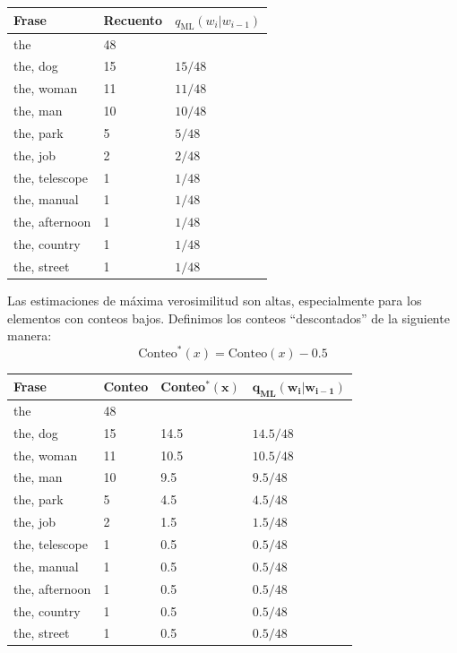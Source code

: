 \begin{table}[h]
    \centering
    \begin{tabular}{lll}
        \textbf{Frase} & \textbf{Recuento} & \textbf{$q_{\text{ML}}(w_i | w_{i-1})$} \\
        \hline
        the & 48 & \\
        the, dog & 15 & $15/48$ \\
        the, woman & 11 & $11/48$ \\
        the, man & 10 & $10/48$ \\
        the, park & 5 & $5/48$ \\
        the, job & 2 & $2/48$ \\
        the, telescope & 1 & $1/48$ \\
        the, manual & 1 & $1/48$ \\
        the, afternoon & 1 & $1/48$ \\
        the, country & 1 & $1/48$ \\
        the, street & 1 & $1/48$ \\
    \end{tabular}
\end{table}

Las estimaciones de máxima verosimilitud son altas, especialmente para los elementos con conteos bajos.  Definimos los conteos ``descontados'' de la siguiente manera:
    \[
    \text{Conteo}^*(x) = \text{Conteo}(x) - 0.5
    \]


\begin{table}[h]
    \centering
    \begin{tabular}{llll}
        \textbf{Frase} & \textbf{Conteo} & \textbf{Conteo}$\mathbf{^*(x)}$ & $\mathbf{q_{\text{ML}}(w_i | w_{i-1})}$ \\
        \hline
        the & 48 & & \\
        the, dog & 15 & 14.5 & $14.5/48$ \\
        the, woman & 11 & 10.5 & $10.5/48$ \\
        the, man & 10 & 9.5 & $9.5/48$ \\
        the, park & 5 & 4.5 & $4.5/48$ \\
        the, job & 2 & 1.5 & $1.5/48$ \\
        the, telescope & 1 & 0.5 & $0.5/48$ \\
        the, manual & 1 & 0.5 & $0.5/48$ \\
        the, afternoon & 1 & 0.5 & $0.5/48$ \\
        the, country & 1 & 0.5 & $0.5/48$ \\
        the, street & 1 & 0.5 & $0.5/48$ \\
    \end{tabular}
\end{table}

